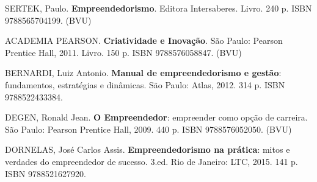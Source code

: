 \begin{pud}
\begin{bibbasica}
		\item SERTEK, Paulo. \textbf{Empreendedorismo}.  Editora Intersaberes. Livro. 240 p.  ISBN 9788565704199. (BVU) %
         
		
	\end{bibbasica}
	
	\begin{bibcomplementar}
		\item ACADEMIA PEARSON. \textbf{Criatividade e Inovação}. São Paulo: Pearson Prentice Hall, 2011. Livro. 150 p. ISBN 9788576058847. (BVU)
        \item BERNARDI, Luiz Antonio. \textbf{Manual de empreendedorismo e gestão}: fundamentos, estratégias e dinâmicas. São Paulo: Atlas, 2012. 314 p. ISBN 9788522433384. 
		
        \item DEGEN, Ronald Jean. \textbf{O Empreendedor}: empreender como opção de carreira. São Paulo: Pearson Prentice Hall, 2009. 440 p. ISBN 9788576052050.  (BVU)
		\item DORNELAS, José Carlos Assis. \textbf{Empreendedorismo na prática}:  mitos e verdades do empreendedor de sucesso. 3.ed. Rio de Janeiro: LTC, 2015. 141 p. ISBN 9788521627920. 
       

\end{bibcomplementar}
\end{pud}
